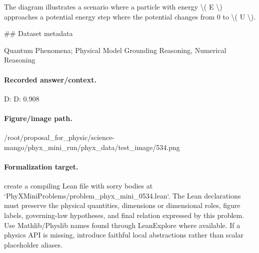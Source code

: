 The diagram illustrates a scenario where a particle with energy \textbackslash{}( E \textbackslash{}) approaches a potential energy step where the potential changes from 0 to \textbackslash{}( U \textbackslash{}).

\#\# Dataset metadata

Quantum Phenomena; Physical Model Grounding Reasoning, Numerical Reasoning

\paragraph{Recorded answer/context.}
D: D: 0.908

\paragraph{Figure/image path.}
/root/proposal\_for\_physic/science-mango/phyx\_mini\_run/phyx\_data/test\_image/534.png

\paragraph{Formalization target.}
create a compiling Lean file with sorry bodies at `PhyXMiniProblems/problem\_phyx\_mini\_0534.lean`. The Lean declarations must preserve the physical quantities, dimensions or dimensional roles, figure labels, governing-law hypotheses, and final relation expressed by this problem.
Use Mathlib/Physlib names found through LeanExplore where available. If a physics API is missing, introduce faithful local abstractions rather than scalar placeholder aliases.

